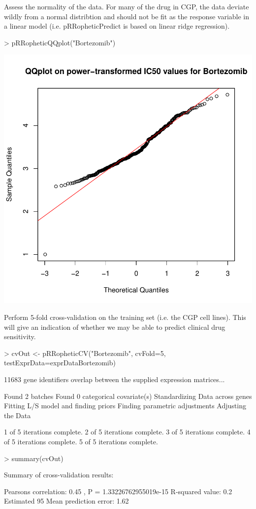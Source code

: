 \documentclass[a4paper]{article}
\begin{document}
Assess the normality of the data. For many of the drug in CGP, the data deviate wildly from a normal distribtion and should not be fit as the response variable in a linear model (i.e. pRRopheticPredict is based on linear ridge regression).
\begin{Schunk}
\begin{Sinput}
> pRRopheticQQplot("Bortezomib")
\end{Sinput}
\end{Schunk}
\includegraphics{vignetteOutline-003}


Perform 5-fold cross-validation on the training set (i.e. the CGP cell lines). This will give an indication of whether we may be able to predict clinical drug sensitivity. 
\begin{Schunk}
\begin{Sinput}
> cvOut <- pRRopheticCV("Bortezomib", cvFold=5, testExprData=exprDataBortezomib)
\end{Sinput}
\begin{Soutput}
 11683  gene identifiers overlap between the supplied expression matrices... 
 
Found 2 batches
Found 0  categorical covariate(s)
Standardizing Data across genes
Fitting L/S model and finding priors
Finding parametric adjustments
Adjusting the Data

1 of 5 iterations complete.
2 of 5 iterations complete.
3 of 5 iterations complete.
4 of 5 iterations complete.
5 of 5 iterations complete.
\end{Soutput}
\begin{Sinput}
> summary(cvOut)
\end{Sinput}
\begin{Soutput}
Summary of cross-validation results:

Pearsons correlation: 0.45 , P =  1.33226762955019e-15 
R-squared value: 0.2
Estimated 95%
Mean prediction error: 1.62
\end{Soutput}
\end{Schunk}
\end{document}
